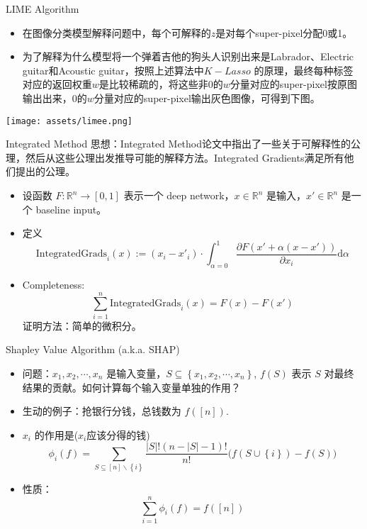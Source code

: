 \begin{frame}{LIME Algorithm}
\begin{itemize}
    \item 在图像分类模型解释问题中，每个可解释的$z$是对每个super-pixel分配0或1。
    \item 为了解释为什么模型将一个弹着吉他的狗头人识别出来是Labrador、Electric guitar和Acoustic guitar，按照上述算法中$K-Lasso$ 的原理，最终每种标签对应的返回权重$w$是比较稀疏的，将这些非$0$的$w$分量对应的super-pixel按原图输出出来，$0$的$w$分量对应的super-pixel输出灰色图像，可得到下图。
\end{itemize}
\begin{center}
    \texttt{[image: assets/limee.png]}
\end{center}
\end{frame}

\begin{frame}{Integrated Method}
    思想：Integrated Method论文中指出了一些关于可解释性的公理，然后从这些公理出发推导可能的解释方法。Integrated Gradients满足所有他们提出的公理。

    \begin{itemize}
        \item 设函数 $F: \mathbb{R}^{n} \to [0, 1]$ 表示一个 deep network，$x\in \mathbb{R}^{n}$ 是输入，$x'\in \mathbb{R}^{n}$ 是一个 baseline input。
        \item 定义 
        \[
        \text{IntegratedGrads}_i(x) := (x_i - x'_i) \cdot \int_{\alpha=0}^{1} \frac{\partial F(x' + \alpha(x - x'))}{\partial x_i}  \mathrm{d}\alpha  
        \]
        \item Completeness: 
        \[
        \sum_{i=1}^{n}\text{IntegratedGrads}_i(x) = F(x) - F(x')
        \]
        证明方法：简单的微积分。
    \end{itemize}
\end{frame}

\begin{frame}{Shapley Value Algorithm (a.k.a. SHAP)}
    \begin{itemize}
        \item 问题：$x_1, x_2, \cdots, x_n$ 是输入变量，$S \subseteq \left\{ x_1, x_2, \cdots, x_n \right\} $, $f(S)$ 表示 $S$ 对最终结果的贡献。如何计算每个输入变量单独的作用？
        \item 生动的例子：抢银行分钱，总钱数为 $f([n])$.
        \item $x_i$ 的作用是($x_i$应该分得的钱)
    \[
        \phi_i(f) = \sum_{S \subseteq [n]\backslash \left\{ i \right\}} \frac{\left| S \right| ! \left( n - |S| - 1 \right) !}{n!} \Big( f(S \cup \left\{ i \right\}) - f(S) \Big)
    \]
    \item 性质：
    \[
        \sum_{i=1}^{n} \phi_i(f) = f([n])  
    \]
    \end{itemize}
\end{frame}
